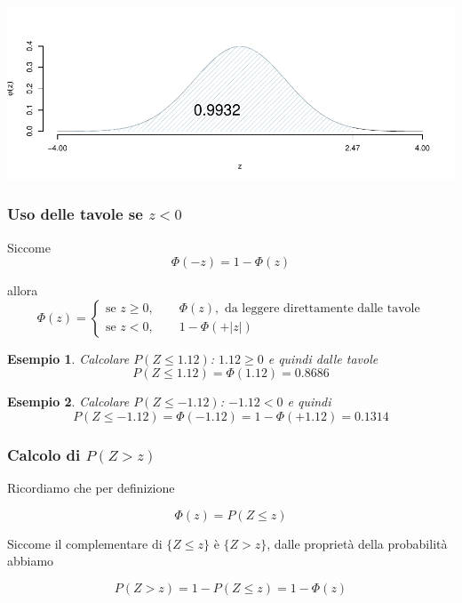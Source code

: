 \documentclass[
  11pt,
]{book}
\theoremstyle{mytheoremstyle}
\theoremstyle{mydefstyle}
\newtheorem{example}{{Esempio}}[section]
\begin{document}
\begin{center}\includegraphics{Appunti_di_Statistica_2025_files/figure-latex/07c-Normale-15,-1} \end{center}

\subsubsection{\texorpdfstring{Uso delle tavole se \(z<0\)}{Uso delle tavole se z\textless0}}\label{uso-delle-tavole-se-z0}

Siccome
\[\Phi(-z)=1-\Phi(z)\]

allora
\[\Phi(z)=\begin{cases}
\text{se }z\geq 0, \qquad \Phi(z),\text{ da leggere direttamente dalle tavole}\\
\text{se } z < 0, \qquad 1-\Phi(+|z|)
\end{cases}\]

\begin{example}
Calcolare \(P(Z\leq 1.12)\): \(1.12\geq 0\) e quindi dalle tavole
\[P(Z\leq 1.12)=\Phi(1.12)=0.8686\]
\end{example}

\begin{example}
Calcolare \(P(Z\leq -1.12)\): \(-1.12< 0\) e quindi
\[P(Z\leq -1.12)=\Phi(-1.12)=1-\Phi(+1.12)=0.1314\]
\end{example}

\subsubsection{\texorpdfstring{Calcolo di \(P(Z>z)\)}{Calcolo di P(Z\textgreater z)}}\label{calcolo-di-pzz}

Ricordiamo che per definizione

\[\Phi(z)=P(Z\leq z)\]

Siccome il complementare di \(\{Z\leq z\}\) è \(\{Z> z\}\), dalle proprietà della probabilità abbiamo

\[P(Z>z)=1-P(Z\leq z)=1-\Phi(z)\]
\end{document}

